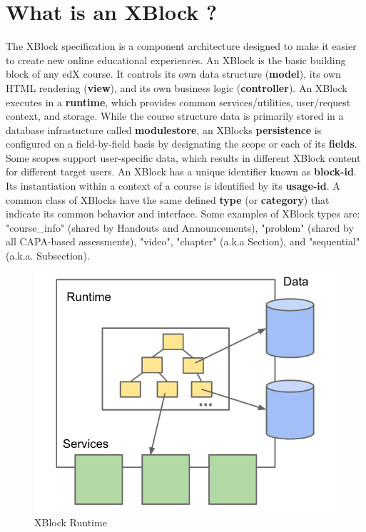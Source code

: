 \section{What is an XBlock ?}
The XBlock specification is a component architecture designed to make it easier to create new
online educational experiences. An XBlock is the basic building block of any edX course. It
controls its own data structure (\textbf{model}), its own HTML rendering (\textbf{view}), and its own business logic
(\textbf{controller}). An XBlock executes in a \textbf{runtime}, which provides common services/utilities,
user/request context, and storage. While the course structure data is primarily stored in a database
infrastucture called \textbf{modulestore}, an XBlocks \textbf{persistence} is configured on a field-by-field basis
by designating the scope or each of its \textbf{fields}. Some scopes support user-specific data, which results
in different XBlock content for different target users.\newline
An XBlock has a unique identifier known as \textbf{block-id}. Its instantiation within a context of a course
is identified by its \textbf{usage-id}. A common class of XBlocks have the same defined \textbf{type} (or \textbf{category})
that indicate its common behavior and interface. Some examples of XBlock types are:
"course\_info" (shared by Handouts and Announcements), "problem" (shared by all CAPA-based
assessments), "video", "chapter" (a.k.a Section), and "sequential" (a.k.a. Subsection).\newline
\begin{figure}
	\includegraphics[width=\linewidth]{images/xblock_runtime.png}
	\caption{XBlock Runtime}
	\label{Fig.1:Xblock runtime}
\end{figure}
